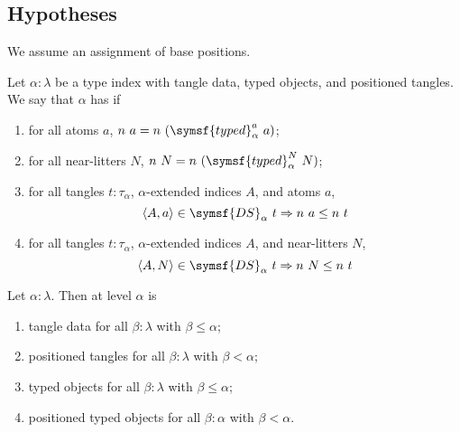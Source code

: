 \subsection{Hypotheses}

We assume an assignment of base positions.
\begin{definition}
    Let \( \alpha : \lambda \) be a type index with tangle data, typed objects, and positioned tangles.
    We say that \( \alpha \) has  if
    \begin{enumerate}
        \item for all atoms \( a \), \( n\ a = n\ (\symsf{typed}^a_\alpha\ a) \);
        \item for all near-litters \( N \), \( n\ N = n\ (\symsf{typed}^N_\alpha\ N) \);
        \item for all tangles \( t : \tau_\alpha \), \( \alpha \)-extended indices \( A \), and atoms \( a \),
        \[ \langle A, a \rangle \in \symsf{DS}_\alpha\ t \Rightarrow n\ a \leq n\ t \]
        \item for all tangles \( t : \tau_\alpha \), \( \alpha \)-extended indices \( A \), and near-litters \( N \),
        \[ \langle A, N \rangle \in \symsf{DS}_\alpha\ t \Rightarrow n\ N \leq n\ t \]
    \end{enumerate}
\end{definition}
\begin{definition}
    Let \( \alpha : \lambda \).
    Then  at level \( \alpha \) is
    \begin{enumerate}
        \item tangle data for all \( \beta : \lambda \) with \( \beta \leq \alpha \);
        \item positioned tangles for all \( \beta : \lambda \) with \( \beta < \alpha \);
        \item typed objects for all \( \beta : \lambda \) with \( \beta \leq \alpha \);
        \item positioned typed objects for all \( \beta : \alpha \) with \( \beta < \alpha \).
    \end{enumerate}
\end{definition}
